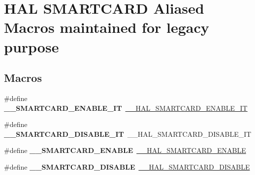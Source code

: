 \hypertarget{group___h_a_l___s_m_a_r_t_c_a_r_d___aliased___macros}{}\section{H\+AL S\+M\+A\+R\+T\+C\+A\+RD Aliased Macros maintained for legacy purpose}
\label{group___h_a_l___s_m_a_r_t_c_a_r_d___aliased___macros}
\subsection*{Macros}
\begin{DoxyCompactItemize}
\item 
\#define {\bfseries \+\_\+\+\_\+\+S\+M\+A\+R\+T\+C\+A\+R\+D\+\_\+\+E\+N\+A\+B\+L\+E\+\_\+\+IT}~\hyperlink{group___s_m_a_r_t_c_a_r_d___exported___macros_gaa80e83666a04249e0c7ca26d036a0d3b}{\+\_\+\+\_\+\+H\+A\+L\+\_\+\+S\+M\+A\+R\+T\+C\+A\+R\+D\+\_\+\+E\+N\+A\+B\+L\+E\+\_\+\+IT}\hypertarget{group___h_a_l___s_m_a_r_t_c_a_r_d___aliased___macros_ga8d5d23bc871cf5aef481120b55f7ac9f}{}\label{group___h_a_l___s_m_a_r_t_c_a_r_d___aliased___macros_ga8d5d23bc871cf5aef481120b55f7ac9f}

\item 
\#define {\bfseries \+\_\+\+\_\+\+S\+M\+A\+R\+T\+C\+A\+R\+D\+\_\+\+D\+I\+S\+A\+B\+L\+E\+\_\+\+IT}~\+\_\+\+\_\+\+H\+A\+L\+\_\+\+S\+M\+A\+R\+T\+C\+A\+R\+D\+\_\+\+D\+I\+S\+A\+B\+L\+E\+\_\+\+IT\hypertarget{group___h_a_l___s_m_a_r_t_c_a_r_d___aliased___macros_ga86c309a6a3c0780c7847062466aaf4cc}{}\label{group___h_a_l___s_m_a_r_t_c_a_r_d___aliased___macros_ga86c309a6a3c0780c7847062466aaf4cc}

\item 
\#define {\bfseries \+\_\+\+\_\+\+S\+M\+A\+R\+T\+C\+A\+R\+D\+\_\+\+E\+N\+A\+B\+LE}~\hyperlink{group___s_m_a_r_t_c_a_r_d___exported___macros_gac739764f1f7326689516931771d60742}{\+\_\+\+\_\+\+H\+A\+L\+\_\+\+S\+M\+A\+R\+T\+C\+A\+R\+D\+\_\+\+E\+N\+A\+B\+LE}\hypertarget{group___h_a_l___s_m_a_r_t_c_a_r_d___aliased___macros_gaa4e29e98414736502d7ee2371481d9f6}{}\label{group___h_a_l___s_m_a_r_t_c_a_r_d___aliased___macros_gaa4e29e98414736502d7ee2371481d9f6}

\item 
\#define {\bfseries \+\_\+\+\_\+\+S\+M\+A\+R\+T\+C\+A\+R\+D\+\_\+\+D\+I\+S\+A\+B\+LE}~\hyperlink{group___s_m_a_r_t_c_a_r_d___exported___macros_gaeea5d27b1628195b28bb3f3fdf0b19bb}{\+\_\+\+\_\+\+H\+A\+L\+\_\+\+S\+M\+A\+R\+T\+C\+A\+R\+D\+\_\+\+D\+I\+S\+A\+B\+LE}\hypertarget{group___h_a_l___s_m_a_r_t_c_a_r_d___aliased___macros_ga7765cb32d89b868ca5e775e7b6a571c7}{}\label{group___h_a_l___s_m_a_r_t_c_a_r_d___aliased___macros_ga7765cb32d89b868ca5e775e7b6a571c7}


\end{DoxyCompactItemize}
